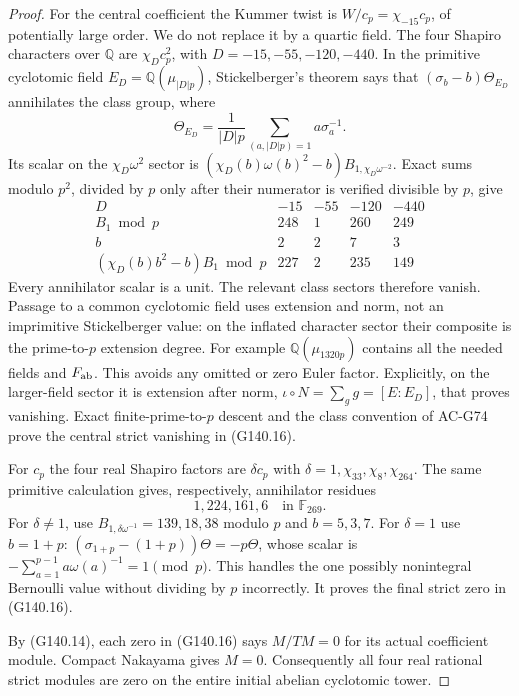 \begin{proof}
For the central coefficient the Kummer twist is
$W/c_p=\chi_{-15}c_p$, of potentially large order.  We do not
replace it by a quartic field.  The four Shapiro characters over
$\mathbb Q$ are $\chi_D c_p^2$, with
$D=-15,-55,-120,-440$.  In the primitive cyclotomic field
$E_D=\mathbb Q(\mu_{|D|p})$, Stickelberger's theorem says that
$(\sigma_b-b)\Theta_{E_D}$ annihilates the class group, where
\[
 \Theta_{E_D}=\frac1{|D|p}
       \sum_{(a,|D|p)=1}a\sigma_a^{-1}.
 \tag{G140.23}
\]
Its scalar on the $\chi_D\omega^2$ sector is
$(\chi_D(b)\omega(b)^2-b)B_{1,\chi_D\omega^{-2}}$.
Exact sums modulo $p^2$, divided by $p$ only after their numerator
is verified divisible by $p$, give
\[
\begin{array}{c|rrrr}
D&-15&-55&-120&-440\\\hline
B_1\bmod p&248&1&260&249\\
b&2&2&7&3\\
(\chi_D(b)b^2-b)B_1\bmod p&227&2&235&149
\end{array} \tag{G140.24}
\]
Every annihilator scalar is a unit.  The relevant class sectors
therefore vanish.  Passage to a common cyclotomic field uses
extension and norm, not an imprimitive Stickelberger value:
on the inflated character sector their composite is the
prime-to-$p$ extension degree.  For example
$\mathbb Q(\mu_{1320p})$ contains all the needed fields and
$F_{\rm ab}$.  This avoids any omitted or zero Euler factor.
Explicitly, on the larger-field sector it is extension after norm,
$\iota\circ N=\sum_g g=[E:E_D]$, that proves vanishing.
Exact finite-prime-to-$p$ descent and the class convention
of AC-G74 prove the central strict vanishing in (G140.16).

For $c_p$ the four real Shapiro factors are $\delta c_p$ with
$\delta=1,\chi_{33},\chi_8,\chi_{264}$.  The same primitive
calculation gives, respectively, annihilator residues
\[
                  1,224,161,6\quad\text{in }\mathbb F_{269}.
 \tag{G140.25}
\]
For $\delta\ne1$, use $B_{1,\delta\omega^{-1}}
=139,18,38$ modulo $p$ and $b=5,3,7$.
For $\delta=1$ use $b=1+p$:
$(\sigma_{1+p}-(1+p))\Theta=-p\Theta$, whose scalar is
$-\sum_{a=1}^{p-1}a\omega(a)^{-1}=1\pmod p$.
This handles the one possibly nonintegral Bernoulli value
without dividing by $p$ incorrectly.
It proves the final strict zero in (G140.16).

By (G140.14), each zero in (G140.16) says $M/TM=0$ for its
actual coefficient module.  Compact Nakayama gives $M=0$.
Consequently all four real rational strict modules are zero
on the entire initial abelian cyclotomic tower.


\end{proof}
